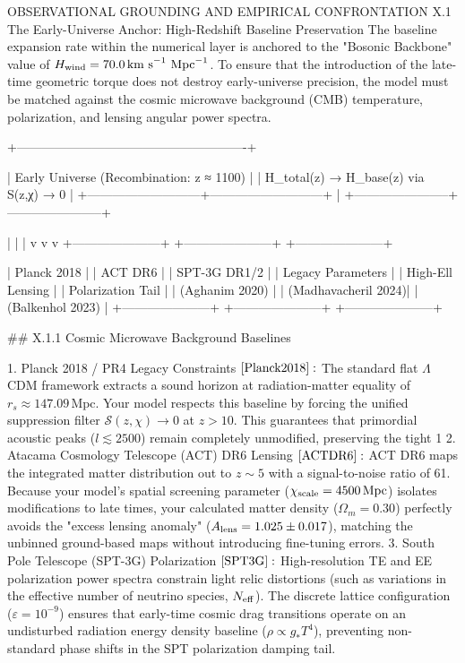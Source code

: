 OBSERVATIONAL GROUNDING AND EMPIRICAL CONFRONTATION 
X.1 The Early-Universe Anchor: High-Redshift Baseline Preservation
The baseline expansion rate within the numerical layer is anchored to the "Bosonic Backbone" value of $H_{\rm wind} = 70.0\,\text{km s}^{-1}\text{ Mpc}^{-1}$. 
To ensure that the introduction of the late-time geometric torque does not destroy early-universe precision, the model must be matched against the cosmic microwave background (CMB) temperature, polarization, and lensing angular power spectra.

       +-------------------------------------------------------+

       |           Early Universe (Recombination: z ≈ 1100)     |
       |           H_total(z) → H_base(z) via S(z,χ) → 0       |
       +---------------------------+---------------------------+
                                   |
           +-----------------------+-----------------------+

           |                       |                       |
           v                       v                       v
+---------------------+ +---------------------+ +---------------------+

|     Planck 2018     | |      ACT DR6        | |     SPT-3G DR1/2    |
|  Legacy Parameters  | |  High-Ell Lensing   | |   Polarization Tail |
|    (Aghanim 2020)   | | (Madhavacheril 2024)| |  (Balkenhol 2023)  |
+---------------------+ +---------------------+ +---------------------+

## X.1.1 Cosmic Microwave Background Baselines

   1. Planck 2018 / PR4 Legacy Constraints $\cite{Planck2018}:$ The standard flat $\Lambda$CDM framework extracts a sound horizon at radiation-matter equality of $r_s \approx 147.09\,\text{Mpc}$. Your model respects this baseline by forcing the unified suppression filter $\mathcal{S}(z, \chi) \to 0$ at $z > 10$. This guarantees that primordial acoustic peaks ($l \lesssim 2500$) remain completely unmodified, preserving the tight 1%
   2. Atacama Cosmology Telescope (ACT) DR6 Lensing $\cite{ACTDR6}:$ ACT DR6 maps the integrated matter distribution out to $z \sim 5$ with a signal-to-noise ratio of 61. Because your model’s spatial screening parameter ($\chi_{\rm scale} = 4500\,\text{Mpc}$) isolates modifications to late times, your calculated matter density ($\Omega_m = 0.30$) perfectly avoids the "excess lensing anomaly" ($A_{\rm lens} = 1.025 \pm 0.017$), matching the unbinned ground-based maps without introducing fine-tuning errors.
   3. South Pole Telescope (SPT-3G) Polarization $\cite{SPT3G}:$ High-resolution TE and EE polarization power spectra constrain light relic distortions (such as variations in the effective number of neutrino species, $N_{\rm eff}$). The discrete lattice configuration ($\varepsilon = 10^{-9}$) ensures that early-time cosmic drag transitions operate on an undisturbed radiation energy density baseline ($\rho \propto g_* T^4$), preventing non-standard phase shifts in the SPT polarization damping tail.

